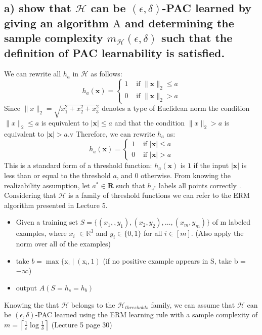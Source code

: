 \documentclass[11pt, a4paper]{article}
\begin{document}
\begin{large}
\subsection{a) show that $\mathcal{H}$ can be $(\epsilon, \delta)$-PAC learned by giving an algorithm $\mathrm{A}$ and determining the sample complexity $m_{\mathcal{H}}(\epsilon, \delta)$ such that the definition of PAC learnability is satisfied. }
We can rewrite all $h_a$ in $\mathcal{H}$ as follows:
$$
h_a(\mathbf{x})= \begin{cases}1 & \text { if }\|\mathbf{x}\|_2 \leq a \\ 0 & \text { if }\|\mathbf{x}\|_2>a\end{cases}
$$
Since $\|x\|_2=\sqrt{x_1^2+x_2^2+x_3^2}$ denotes a type of Euclidean norm the condition $\|x\|_2 \leq a$ is equivalent to $|\mathbf{x}| \leq a$ and that the condition $\|x\|_2 > a$ is equivalent to $|\mathbf{x}| > a$.v
Therefore, we can rewrite $h_a$ as:
$$
h_a(\mathbf{x})= \begin{cases}1 & \text { if }|\mathbf{x}| \leq a \\ 0 & \text { if }|\mathbf{x}|>a\end{cases}
$$
This is a standard form of a threshold function: $h_a(\mathbf{x})$ is $1$ if the input $|\mathbf{x}|$ is less than or equal to the threshold $a$, and $0$ otherwise.
From knowing the realizability assumption, let $a^* \in \mathbf{R}$ such that $
h_{\mathrm{a}^*}$ labels all points correctly
. Considering that $\mathcal{H}$ is a family of threshold functions we can refer to the ERM algorithm presented in Lecture 5.
\begin{itemize}
    \item Given a training set $S=\{(x_1,,y_1),(x_2,y_2),…,(x_m,y_m)\}$ of m labeled examples, where $x_i$ $\in \mathbb{R}^3$ and $y_i \in \{0,1\}$ for all $i \in [m]$. (Also apply the norm over all of the examples)
    \item take $b = \max \{\mathrm{x}_{\mathrm{i}} \mid(\mathrm{x}_{\mathrm{i}}, 1)$ (if no positive example appears in S, take b = $-\infty$)
    \item output $A(S = h_s = h_b)$
\end{itemize}
Knowing the that $\mathcal{H}$ belongs to the $\mathcal{H}_{thresholds}$ family, we can assume that $\mathcal{H}$ can be $(\epsilon, \delta)$-PAC learned using the ERM learning rule with a sample complexity of $m=\left\lceil\frac{1}{\varepsilon} \log \frac{1}{\delta}\right\rceil$ (Lecture 5 page 30)







\end{large}
\end{document}
